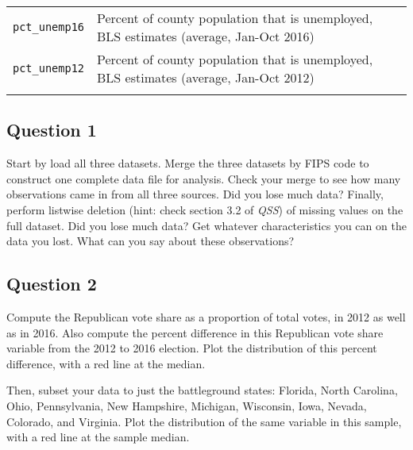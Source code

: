 \documentclass[]{article}
\begin{document}
\begin{longtable}[c]{@{}ll@{}}
\begin{minipage}[t]{0.20\columnwidth}\raggedright
\texttt{pct\_unemp16}
\end{minipage} & \begin{minipage}[t]{0.74\columnwidth}\raggedright
Percent of county population that is unemployed, BLS estimates (average,
Jan-Oct 2016)
\end{minipage}
\\\addlinespace
\begin{minipage}[t]{0.20\columnwidth}\raggedright
\texttt{pct\_unemp12}
\end{minipage} & \begin{minipage}[t]{0.74\columnwidth}\raggedright
Percent of county population that is unemployed, BLS estimates (average,
Jan-Oct 2012)
\end{minipage}
\\\addlinespace
\bottomrule
\end{longtable}

\subsection{Question 1}\label{question-1}

Start by load all three datasets. Merge the three datasets by FIPS code
to construct one complete data file for analysis. Check your merge to
see how many observations came in from all three sources. Did you lose
much data? Finally, perform listwise deletion (hint: check section 3.2
of \emph{QSS}) of missing values on the full dataset. Did you lose much
data? Get whatever characteristics you can on the data you lost. What
can you say about these observations?

\subsection{Question 2}\label{question-2}

Compute the Republican vote share as a proportion of total votes, in
2012 as well as in 2016. Also compute the percent difference in this
Republican vote share variable from the 2012 to 2016 election. Plot the
distribution of this percent difference, with a red line at the median.

Then, subset your data to just the battleground states: Florida, North
Carolina, Ohio, Pennsylvania, New Hampshire, Michigan, Wisconsin, Iowa,
Nevada, Colorado, and Virginia. Plot the distribution of the same
variable in this sample, with a red line at the sample median.
\end{document}
